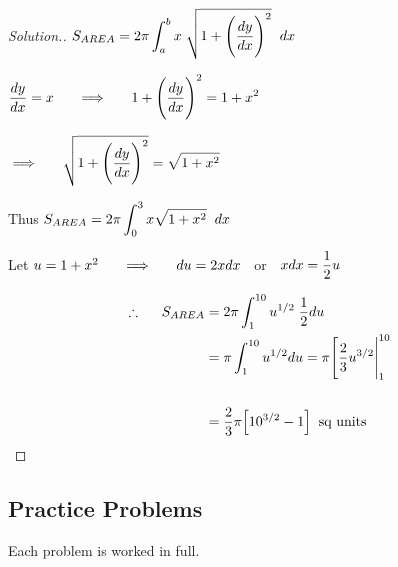 \documentclass[11pt,a4paper]{article}
\theoremstyle{definition}
\newenvironment{solution}
  {\renewcommand{\qedsymbol}{}\begin{proof}[\textit{Solution}.]}
  {\end{proof}}
\begin{document}
\begin{solution}


$\displaystyle{S_{AREA} =  2\pi \int^b_a x\hspace{0.1cm} \sqrt{1 + \Bigg(\dfrac{dy}{dx}\Bigg)^2}\hspace{0.2cm}dx}$


$\displaystyle{\dfrac{dy}{dx}  = x \hspace{0.5cm} \implies \hspace{0.5cm} 1 + \Bigg(\dfrac{dy}{dx}\Bigg)^2 = 1 + x^2 }$


$\displaystyle{\implies \hspace{0.5cm} \sqrt{1 + \Bigg(\dfrac{dy}{dx}\Bigg)^2} = \sqrt{ 1 + x^2}}$


Thus $\displaystyle{S_{AREA} = 2\pi \int^3_0 x\sqrt{1 + x^2}\hspace{0.2cm}dx}$


Let $u = 1 + x^2 \hspace{0.5cm} \implies \hspace{0.5cm} du = 2x dx\hspace{0.2cm}$ or $\hspace{0.2cm} xdx = \dfrac{1}{2}u$

\begin{align*}
\therefore\hspace{0.5cm} S_{AREA} & = 2\pi \int^{10}_1u^{1/2}\hspace{0.1cm} \dfrac{1}{2}du\\
& = \pi \int^{10}_1 u^{1/2}du = \pi \Bigg[ \dfrac{2}{3}u^{3/2}\Bigg|^{10}_1\\\\
& = \dfrac{2}{3}\pi \Big[10^{3/2} - 1 \Big]\hspace{0.2cm} \text{sq units}\\
\end{align*}

\pagebreak
\end{solution}

\subsection{Practice Problems}

Each problem is worked in full.
\end{document}
